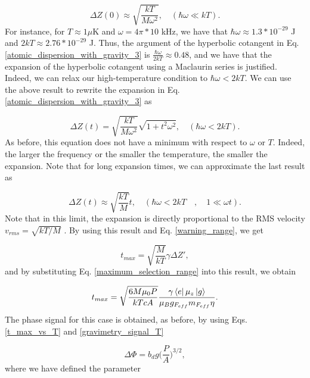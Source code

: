 \documentclass{article}
\begin{document}
\begin{equation}
    \Delta Z (0) \approx \sqrt{\frac{ kT}{ M \omega^{2}}  }, \quad (\hbar \omega \ll kT).
\end{equation}
%
For instance, for $T\approx 1 \mu$K and $\omega = 4\pi *10$ kHz, we have that $\hbar \omega \approx 1.3*10^{-29}$ J and $2 kT \approx 2.76*10^{-29}$ J. Thus, the argument of the hyperbolic cotangent in Eq. \ref{atomic_dispersion_with_gravity_3} is $\frac{\hbar \omega}{2kT} \approx 0.48$, and we have that the expansion of the hyperbolic cotangent using a Maclaurin series is justified. Indeed, we can relax our high-temperature condition to $\hbar \omega < 2kT$. We can use the above result to rewrite the expansion in Eq. \ref{atomic_dispersion_with_gravity_3} as

\begin{equation}\label{minimal_expansion_high_temp}
    \Delta Z (t) = \sqrt{\frac{ kT}{ M \omega^{2}} } \sqrt{1+t^{2}\omega^{2}}, \quad (\hbar \omega < 2kT).
\end{equation}
%
As before, this equation does not have a minimum with respect to $\omega$ or $T$. Indeed, the larger the frequency or the smaller the temperature, the smaller the expansion. Note that for long expansion times, we can approximate the last result as

\begin{equation}\label{minimal_expansion_high_temp_long_time}
    \Delta Z (t) \approx \sqrt{\frac{ kT}{ M } }t, \quad (\hbar \omega < 2kT \quad , \quad 1 \ll \omega t ).
\end{equation}
%
Note that in this limit, the expansion is directly proportional to the RMS velocity $v_{rms}=\sqrt{k T /M}$ \cite{McQuarrie1976-cw_BOOK}. By using this result and Eq. \ref{warning_range}, we get

\begin{equation}
    t_{max} = \sqrt{\frac{M}{k T}} \gamma \Delta Z',
\end{equation}
%
and by substituting Eq. \ref{maximum_selection_range} into this result, we obtain

\begin{equation}
    t_{max} = \sqrt{\frac{6M \mu_{0} P}{k T c A}} \frac{ \gamma \bra{e} \mu_{z} \ket{g}}{\mu_{B} g_{F_{eff}} m_{F_{eff}} \eta}.
\end{equation}
%
The phase signal for this case is obtained, as before, by using Eqs. \ref{t_max_vs_T} and \ref{gravimetry_signal_T}

\begin{equation}\label{gravimetry_signal_irradiance_dipole_trap}
    \Delta \Phi = b_{d} g \bigg(\frac{P}{A}\bigg)^{3/2}, 
\end{equation}
%
where we have defined the parameter
\end{document}
